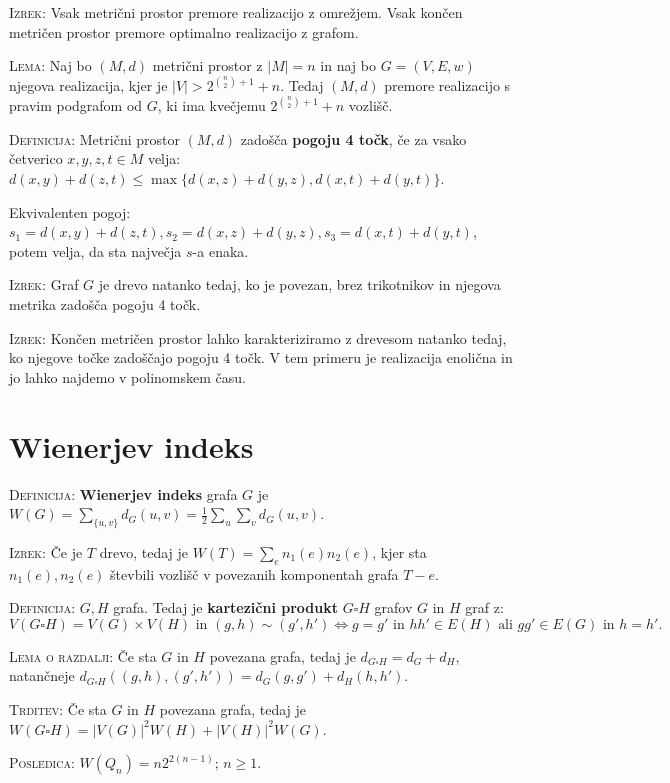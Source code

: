 \documentclass[8pt,a4paper]{amsart}
\theoremstyle{definition} %
\theoremstyle{plain} %
\begin{document}
\textsc{Izrek:} Vsak metrični prostor premore realizacijo z omrežjem. Vsak
končen metričen prostor premore optimalno realizacijo z grafom.

\textsc{Lema:} Naj bo $(M,d)$ metrični prostor z $|M|=n$ in naj bo $G=(V,E,w)$
njegova realizacija, kjer je $|V| > 2^{\binom{n}{2}+1}+n$. Tedaj $(M,d)$ premore
realizacijo s pravim podgrafom od $G$, ki ima kvečjemu  $2^{\binom{n}{2}+1}+n$
vozlišč.

\textsc{Definicija:} Metrični prostor $(M,d)$ zadošča \textbf{pogoju 4 točk}, če
za vsako četverico $x,y,z,t \in M$ velja: $d(x,y)+d(z,t) \leq
\max{\{d(x,z)+d(y,z), d(x,t)+d(y,t)\}}$.

Ekvivalenten pogoj: $s_1 = d(x,y)+d(z,t), s_2 = d(x,z)+d(y,z), s_3=
d(x,t)+d(y,t)$, potem velja, da sta največja $s$-a enaka.

\textsc{Izrek:} Graf $G$ je drevo natanko tedaj, ko je povezan, brez trikotnikov
in njegova metrika zadošča pogoju 4 točk.

\textsc{Izrek:} Končen metričen prostor lahko karakteriziramo z drevesom natanko
tedaj, ko njegove točke zadoščajo pogoju 4 točk. V tem primeru je realizacija
enolična in jo lahko najdemo v polinomskem času.

\section{Wienerjev indeks}

\textsc{Definicija:} \textbf{Wienerjev indeks} grafa $G$ je $W(G) =
\sum_{\{u,v\}}d_G(u,v) = \frac{1}{2}\sum_u \sum_v d_G(u,v)$.

\textsc{Izrek:} Če je $T$ drevo, tedaj je $W(T) = \sum_e n_1(e) n_2(e)$, kjer
sta $n_1(e), n_2(e)$ števbili vozlišč v povezanih komponentah grafa $T-e$.

\textsc{Definicija:} $G,H$ grafa. Tedaj je \textbf{kartezični produkt} $G
\square H$ grafov $G$ in $H$ graf z: $$ V(G \square H) = V(G) \times
V(H)\text{  in } (g,h) \sim (g',h') \Longleftrightarrow g=g' \text{ in } hh' \in
E(H) \text{ ali } gg' \in E(G) \text{ in } h=h'.  $$

\textsc{Lema o razdalji:} Če sta $G$ in $H$ povezana grafa, tedaj je $d_{G
\square H} = d_G + d_H$, natančneje $d_{G \square H}((g,h),(g',h')) =
d_G(g,g') + d_H(h,h')$.

\textsc{Trditev:} Če sta $G$ in $H$ povezana grafa, tedaj je $W(G\square H) =
|V(G)|^2W(H) + |V(H)|^2W(G)$.

\textsc{Posledica:} $W(Q_n) = n2^{2(n-1)}$; $n \geq 1$.
\end{document}
